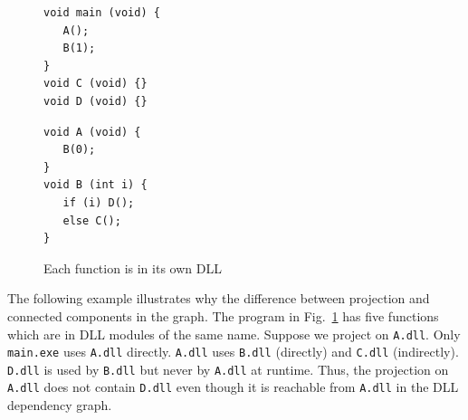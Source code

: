 \begin{figure}
\centering
\begin{minipage}[t]{3.5cm}
\begin{verbatim}
void main (void) {
   A();
   B(1);
}
void C (void) {}
void D (void) {}
\end{verbatim}
\end{minipage}
\hspace{2.0cm}
\begin{minipage}[t]{3.0cm}
\begin{verbatim}
void A (void) {
   B(0);
}
void B (int i) {
   if (i) D();
   else C();
}
\end{verbatim}
\end{minipage}
\caption{Each function is in its own DLL}
\label{fig:indcalls}
\end{figure}

The following example illustrates why the difference between
projection and connected components in the graph.
The program in Fig.~\ref{fig:indcalls} has
five functions which are in DLL modules of the same name.
Suppose we project on {\tt A.dll}.
Only {\tt main.exe} uses {\tt A.dll} directly.
{\tt A.dll} uses {\tt B.dll} (directly) and
{\tt C.dll} (indirectly).
{\tt D.dll} is used by {\tt B.dll} but never by {\tt A.dll} at runtime.
Thus, the projection on {\tt A.dll} does not contain {\tt D.dll} even though
it is reachable from {\tt A.dll} in the DLL dependency graph.

